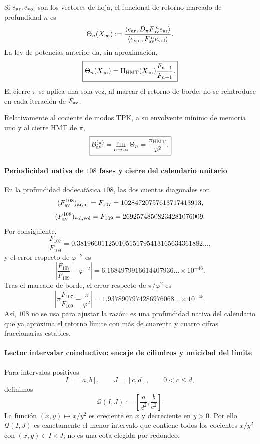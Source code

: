 Si \(e_{\rm ar},e_{\rm vol}\) son los vectores de hoja, el funcional de
retorno marcado de profundidad \(n\) es
\[
 \Theta_n(X_\infty):=
 \frac{\langle e_{\rm ar},
 D_\pi F_{\rm av}^{\,n}e_{\rm ar}\rangle}
 {\langle e_{\rm vol},
 F_{\rm av}^{\,n}e_{\rm vol}\rangle}.
\]
La ley de potencias anterior da, sin aproximación,
\[
 \boxed{
 \Theta_n(X_\infty)
 =\Pi_{\rm HMT}(X_\infty)\frac{F_{n-1}}{F_{n+1}}.}
\]
El cierre \(\pi\) se aplica una sola vez, al marcar el retorno de borde; no
se reintroduce en cada iteración de \(F_{\rm av}\).

\begin{corollary}
\label{p12-83-c16-s3:cor:pi-phi2-corta}
Relativamente al cociente de modos TPK, a su envolvente mínimo de memoria
uno y al cierre HMT de \(\pi\),
\[
 \boxed{\mathcal B_{\rm av}^{(\pi)}
 =\lim_{n\to\infty}\Theta_n
 =\frac{\pi_{\rm HMT}}{\varphi^2}.}
\]
\end{corollary}

\paragraph{Periodicidad nativa de \(108\) fases y cierre del calendario unitario}
En la profundidad dodecafásica \(108\), las dos cuentas diagonales son
\[
 (F_{\rm av}^{108})_{\rm ar,ar}
 =F_{107}=10284720757613717413913,
\]
\[
 (F_{\rm av}^{108})_{\rm vol,vol}
 =F_{109}=26925748508234281076009.
\]
Por consiguiente,
\[
 \frac{F_{107}}{F_{109}}
 =0.381966011250105151795413165634361882\ldots,
\]
y el error respecto de \(\varphi^{-2}\) es
\[
 \left|\frac{F_{107}}{F_{109}}-\varphi^{-2}\right|
 =6.1684979916614407936\ldots\times10^{-46}.
\]
Tras el marcado de borde, el error respecto de
\(\pi/\varphi^2\) es
\[
 \left|\pi\frac{F_{107}}{F_{109}}-\frac{\pi}{\varphi^2}\right|
 =1.9378907974286976068\ldots\times10^{-45}.
\]
Así, \(108\) no se usa para ajustar la razón: es una profundidad nativa del
calendario que ya aproxima el retorno límite con más de cuarenta y cuatro
cifras fraccionarias estables.

\paragraph{Lector intervalar coinductivo: encaje de cilindros y unicidad del límite}
Para intervalos positivos
\[
 I=[a,b],\qquad J=[c,d],\qquad 0<c\leq d,
\]
definimos
\[
 \mathcal Q(I,J):=
 \left[\frac{a}{d^2},\frac{b}{c^2}\right].
\]
La función \((x,y)\mapsto x/y^2\) es creciente en \(x\) y decreciente en
\(y>0\). Por ello \(\mathcal Q(I,J)\) es exactamente el menor intervalo
que contiene todos los cocientes \(x/y^2\) con
\((x,y)\in I\times J\); no es una cota elegida por redondeo.

